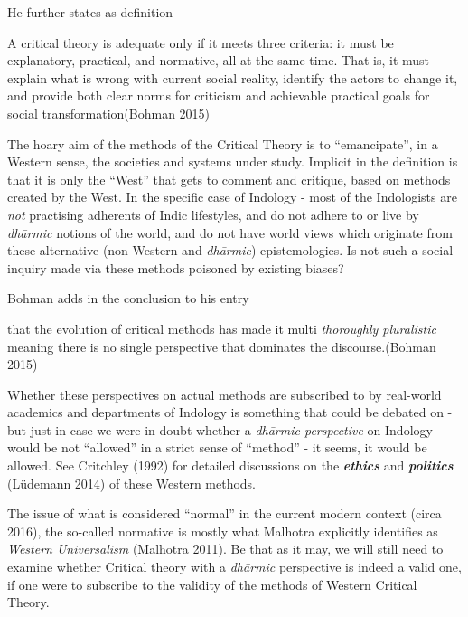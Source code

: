 He further states as definition
\begin{myquote}
A critical theory is adequate only if it meets three criteria: it must be explanatory, practical, and normative, all at the same time. That is, it must explain what is wrong with current social reality, identify the actors to change it, and provide both clear norms for criticism and achievable practical goals for social transformation\hfill (Bohman 2015)
\end{myquote}

\newpage

The hoary aim of the methods of the Critical Theory is to ``emancipate'', in a Western sense, the societies and systems under study. Implicit in the definition is that it is only the ``West'' that gets to comment and critique, based on methods created by the West. In the specific case of Indology - most of the Indologists are {\sl not} practising adherents of Indic lifestyles, and do not adhere to or live by {\sl dhārmic} notions of the world, and do not have world views which originate from these alternative (non-Western and {\sl dhārmic}) epistemologies. Is not such a social inquiry made via these methods poisoned by existing biases?

Bohman adds in the conclusion to his entry
\begin{myquote}
that the evolution of critical methods has made it multi {\sl thoroughly pluralistic} meaning there is no single perspective that dominates the discourse.\hfill (Bohman 2015)
\end{myquote}

Whether these perspectives on actual methods are subscribed to by real-world  academics and departments of Indology is something that could be debated on - but just in case we were in doubt whether a {\sl dhārmic perspective} on Indology would be  not ``allowed'' in a strict sense of ``method'' - it seems, it would be allowed. See Critchley (1992) for detailed discussions on the {{\sl\bfseries ethics}\relax} and {{\sl\bfseries politics}\relax} (Lüdemann 2014) of these Western methods.

The issue of what is considered ``normal'' in the current modern context (circa 2016), the so-called normative is mostly what Malhotra explicitly identifies as {\sl Western Universalism} (Malhotra 2011). Be that as it may, we will still need to examine whether Critical theory with a {\sl dhārmic} perspective is indeed a valid one, if one were to subscribe to the validity of the methods of Western Critical Theory.

